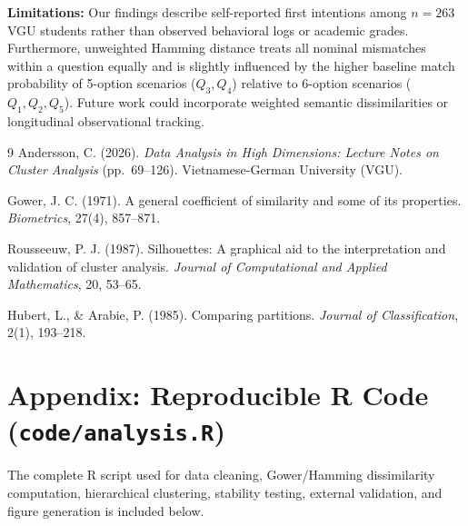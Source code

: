 \documentclass[11pt,a4paper]{article}
\begin{document}
\textbf{Limitations:} Our findings describe self-reported first intentions among $n = 263$ VGU students rather than observed behavioral logs or academic grades. Furthermore, unweighted Hamming distance treats all nominal mismatches within a question equally and is slightly influenced by the higher baseline match probability of 5-option scenarios ($Q_3, Q_4$) relative to 6-option scenarios ($Q_1, Q_2, Q_5$). Future work could incorporate weighted semantic dissimilarities or longitudinal observational tracking.

\begin{thebibliography}{9}
\footnotesize
{}
Andersson, C. (2026). \textit{Data Analysis in High Dimensions: Lecture Notes on Cluster Analysis} (pp.\ 69--126). Vietnamese-German University (VGU).

Gower, J. C. (1971). A general coefficient of similarity and some of its properties. \textit{Biometrics}, 27(4), 857--871.

Rousseeuw, P. J. (1987). Silhouettes: A graphical aid to the interpretation and validation of cluster analysis. \textit{Journal of Computational and Applied Mathematics}, 20, 53--65.

Hubert, L., \& Arabie, P. (1985). Comparing partitions. \textit{Journal of Classification}, 2(1), 193--218.
\end{thebibliography}

\newpage
\appendix
\section{Appendix: Reproducible R Code (\texttt{code/analysis.R})}
\noindent
The complete R script used for data cleaning, Gower/Hamming dissimilarity computation, hierarchical clustering, stability testing, external validation, and figure generation is included below.


\end{document}
